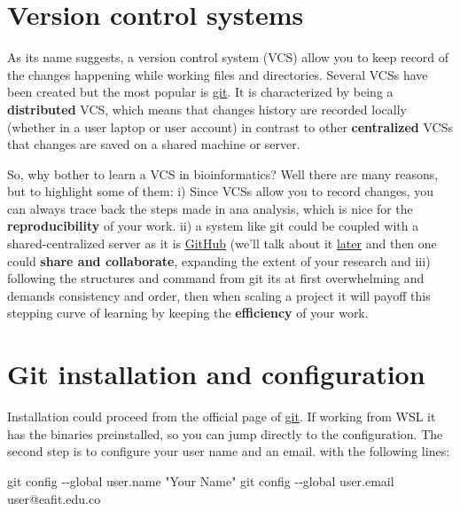 \documentclass[
  letterpaper,
  DIV=11,
  numbers=noendperiod,
  oneside]{scrreprt}
\newenvironment{Shaded}{\begin{snugshade}}{\end{snugshade}}
\newcommand{\AttributeTok}[1]{\textcolor[rgb]{0.40,0.45,0.13}{#1}}
\newcommand{\FunctionTok}[1]{\textcolor[rgb]{0.28,0.35,0.67}{#1}}
\newcommand{\NormalTok}[1]{\textcolor[rgb]{0.00,0.23,0.31}{#1}}
\newcommand{\StringTok}[1]{\textcolor[rgb]{0.13,0.47,0.30}{#1}}
\begin{document}
\hypertarget{version-control-systems}{%
\section{Version control systems}\label{version-control-systems}}

As its name suggests, a version control system (VCS) allow you to keep
record of the changes happening while working files and directories.
Several VCSs have been created but the most popular is
\href{https://git-scm.com}{git}. It is characterized by being a
\textbf{distributed} VCS, which means that changes history are recorded
locally (whether in a user laptop or user account) in contrast to other
\textbf{centralized} VCSs that changes are saved on a shared machine or
server.

So, why bother to learn a VCS in bioinformatics? Well there are many
reasons, but to highlight some of them: i) Since VCSs allow you to
record changes, you can always trace back the steps made in ana
analysis, which is nice for the \textbf{reproducibility} of your work.
ii) a system like git could be coupled with a shared-centralized server
as it is \href{https://github.com}{GitHub} (we'll talk about it
\protect\hyperlink{exploring-github}{later} and then one could
\textbf{share and collaborate}, expanding the extent of your research
and iii) following the structures and command from git its at first
overwhelming and demands consistency and order, then when scaling a
project it will payoff this stepping curve of learning by keeping the
\textbf{efficiency} of your work.

\hypertarget{git-installation-and-configuration}{%
\section{Git installation and
configuration}\label{git-installation-and-configuration}}

Installation could proceed from the official page of
\href{https://git-scm.com}{git}. If working from WSL it has the binaries
preinstalled, so you can jump directly to the configuration. The second
step is to configure your user name and an email. with the following
lines:

\begin{Shaded}
\begin{Highlighting}[]
\FunctionTok{git}\NormalTok{ config }\AttributeTok{{-}{-}global}\NormalTok{ user.name }\StringTok{"Your Name"}
\FunctionTok{git}\NormalTok{ config }\AttributeTok{{-}{-}global}\NormalTok{ user.email user@eafit.edu.co}
\end{Highlighting}
\end{Shaded}
\end{document}
